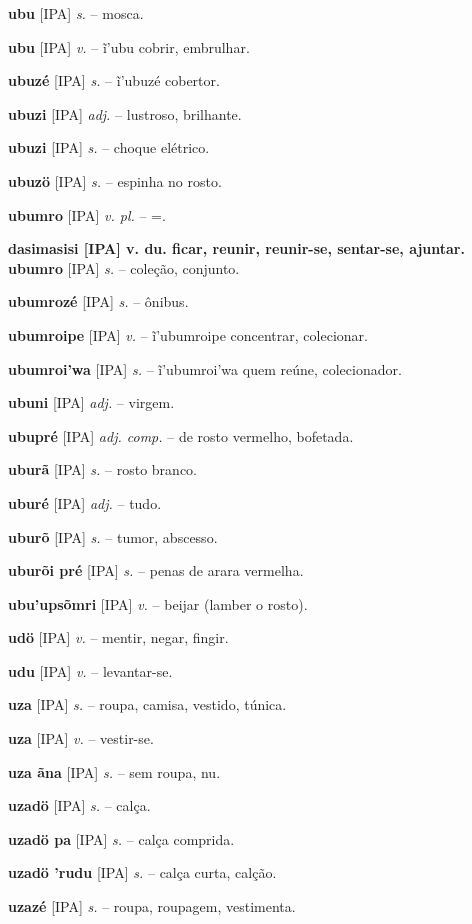 \textbf{ubu} [IPA] \textit{s.} -- mosca.

\textbf{ubu} [IPA] \textit{v.} -- ĩ'ubu cobrir, embrulhar.

\textbf{ubuzé} [IPA] \textit{s.} -- ĩ'ubuzé cobertor.

\textbf{ubuzi} [IPA] \textit{adj.} -- lustroso, brilhante.

\textbf{ubuzi} [IPA] \textit{s.} -- choque elétrico.

\textbf{ubuzö} [IPA] \textit{s.} -- espinha no rosto.

\textbf{ubumro} [IPA] \textit{v. pl.} -- =.

\textbf{dasimasisi [IPA] v. du. ficar, reunir, reunir-se, sentar-se, ajuntar. ubumro} [IPA] \textit{s.} -- coleção, conjunto.

\textbf{ubumrozé} [IPA] \textit{s.} -- ônibus.

\textbf{ubumroipe} [IPA] \textit{v.} -- ĩ'ubumroipe concentrar, colecionar.

\textbf{ubumroi'wa} [IPA] \textit{s.} -- ĩ'ubumroi'wa quem reúne, colecionador.

\textbf{ubuni} [IPA] \textit{adj.} -- virgem.

\textbf{ubupré} [IPA] \textit{adj. comp.} -- de rosto vermelho, bofetada.

\textbf{uburã} [IPA] \textit{s.} -- rosto branco.

\textbf{uburé} [IPA] \textit{adj.} -- tudo.

\textbf{uburõ} [IPA] \textit{s.} -- tumor, abscesso.

\textbf{uburõi pré} [IPA] \textit{s.} -- penas de arara vermelha.

\textbf{ubu'upsõmri} [IPA] \textit{v.} -- beijar (lamber o rosto).

\textbf{udö} [IPA] \textit{v.} -- mentir, negar, fingir.

\textbf{udu} [IPA] \textit{v.} -- levantar-se.

\textbf{uza} [IPA] \textit{s.} -- roupa, camisa, vestido, túnica.

\textbf{uza} [IPA] \textit{v.} -- vestir-se.

\textbf{uza ãna} [IPA] \textit{s.} -- sem roupa, nu.

\textbf{uzadö} [IPA] \textit{s.} -- calça.

\textbf{uzadö pa} [IPA] \textit{s.} -- calça comprida.

\textbf{uzadö 'rudu} [IPA] \textit{s.} -- calça curta, calção.

\textbf{uzazé} [IPA] \textit{s.} -- roupa, roupagem, vestimenta.

